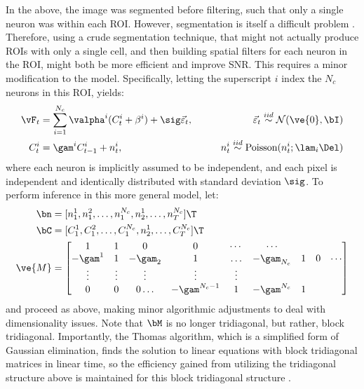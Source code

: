 In the above, the image was segmented before filtering, such that only a single neuron was within each ROI.  However, segmentation is itself a difficult problem \cite{ShiMalik97}.  Therefore, using a crude segmentation technique, that might not actually produce ROIs with only a single cell, and then building spatial filters for each neuron in the ROI, might both be more efficient and improve SNR.  This requires a minor modification to the model.  Specifically, letting the superscript $i$ index the $N_c$ neurons in this ROI, yields:  
\begin{align} \label{eq:overlapping}
\vF_t &= \sum_{i=1}^{N_c}\valpha^i (C^i_t + \beta^i) +  \sig\vec{\varepsilon}_t, \qquad &\vec{\varepsilon}_t \overset{iid}{\sim} \mathcal{N}(\ve{0},\bI)   \\
C^i_t &= \gam^i C^i_{t-1} + n^i_t, & n^i_t \overset{iid}{\sim} \text{Poisson}(n^i_t; \lam_i \Del)
\end{align}
\noindent where each neuron is implicitly assumed to be independent, and each pixel is independent and identically distributed with standard deviation $\sig$.  To perform inference in this more general model, let:
\begin{align} \label{eq:M2}
\bn &=  [n^1_1, n^2_1, \ldots, n^{N_c}_1, n^1_2, \ldots, n^{N_c}_T]\T \\
\bC &=  [C^1_1, C^2_1, \ldots, C^{N_c}_1, n^1_2, \ldots, C^{N_c}_T]\T \\
\ve{M} &= %
\begin{bmatrix}
1 & 1 & 0 & 0 & \cdots & \cdots \\
-\gam^1 &  1 & -\gam_2 & 1 & \ldots &  -\gam_{N_c} & 1 & 0 & \cdots \\
\vdots & \vdots & \vdots & \vdots & \vdots  \\
0 & 0 & 0 \ldots &  -\gam^{N_c-1} & 1 & -\gam^{N_c} & 1 
\end{bmatrix}
\end{align} 
\noindent and proceed as above, making minor algorithmic adjustments to deal with dimensionality issues.  Note that $\bM$ is no longer tridiagonal, but rather, block tridiagonal.  Importantly, the Thomas algorithm, which is a simplified form of Gaussian elimination, finds the solution to linear equations with block tridiagonal matrices in linear time, so the efficiency gained from utilizing the tridiagonal structure above is maintained for this block tridiagonal structure \cite{PRE92}.   

